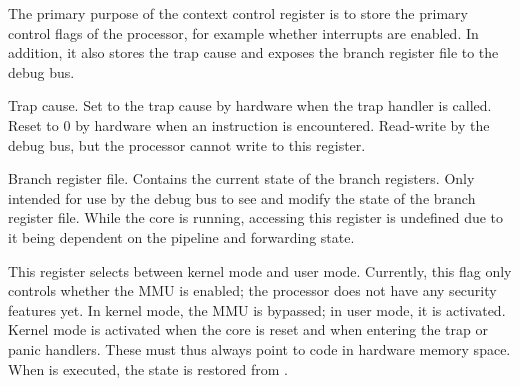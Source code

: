 

The primary purpose of the context control register is to store the primary
control flags of the processor, for example whether interrupts are enabled. In
addition, it also stores the trap cause and exposes the branch register file to
the debug bus.

Trap cause. Set to the trap cause by hardware when the trap handler is called. 
Reset to 0 by hardware when an  instruction is encountered. Read-write 
by the debug bus, but the processor cannot write to this register.

\declaration{}

\implementation{}

Branch register file. Contains the current state of the branch registers. Only
intended for use by the debug bus to see and modify the state of the branch
register file. While the core is running, accessing this register is undefined
due to it being dependent on the pipeline and forwarding state.

\implementation{}

This register selects between kernel mode and user mode. Currently, this flag 
only controls whether the MMU is enabled; the \rvex{} processor does not have 
any security features yet. In kernel mode, the MMU is bypassed; in user mode, it 
is activated. Kernel mode is activated when the core is reset and when entering 
the trap or panic handlers. These must thus always point to code in hardware 
memory space. When  is executed, the state is restored from
.

